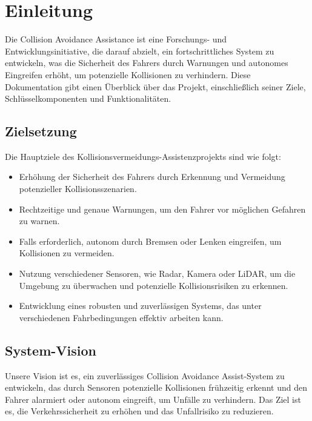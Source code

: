 \section{Einleitung}
Die Collision Avoidance Assistance ist eine Forschungs- und Entwicklungsinitiative, die darauf abzielt, ein fortschrittliches System zu entwickeln, was die Sicherheit des Fahrers durch Warnungen und autonomes Eingreifen erhöht, um potenzielle Kollisionen zu verhindern. Diese Dokumentation gibt einen Überblick über das Projekt, einschließlich seiner Ziele, Schlüsselkomponenten und Funktionalitäten.

\subsection{Zielsetzung}
Die Hauptziele des Kollisionsvermeidungs-Assistenzprojekts sind wie folgt:
\begin{itemize}
	\item Erhöhung der Sicherheit des Fahrers durch Erkennung und Vermeidung potenzieller Kollisionsszenarien.
	\item Rechtzeitige und genaue Warnungen, um den Fahrer vor möglichen Gefahren zu warnen.
	\item Falls erforderlich, autonom durch Bremsen oder Lenken eingreifen, um Kollisionen zu vermeiden.
	\item Nutzung verschiedener Sensoren, wie Radar, Kamera oder LiDAR, um die Umgebung zu überwachen und potenzielle Kollisionsrisiken zu erkennen.
	\item Entwicklung eines robusten und zuverlässigen Systems, das unter verschiedenen Fahrbedingungen effektiv arbeiten kann.
\end{itemize}

\subsection{System-Vision}
Unsere Vision ist es, ein zuverlässiges Collision Avoidance Assist-System zu entwickeln, das durch Sensoren potenzielle Kollisionen frühzeitig erkennt und den Fahrer alarmiert oder autonom eingreift, um Unfälle zu verhindern. Das Ziel ist es, die Verkehrssicherheit zu erhöhen und das Unfallrisiko zu reduzieren.
